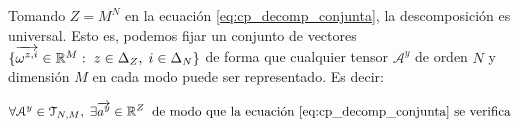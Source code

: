 \begin{proposicion}
	Tomando $Z = M^N$ en la ecuación \eqref{eq:cp_decomp_conjunta}, la descomposición es universal. Esto es, podemos fijar un conjunto de vectores $\{ \overrightarrow{\omega^{z, i}} \in \mathbb{R}^M: \; z \in \Delta_{Z}, \; i \in \Delta_{N} \}$ de forma que cualquier tensor $\mathcal{A}^y$ de orden $N$ y dimensión $M$ en cada modo puede ser representado. Es decir:

	\begin{equation}
		\forall \mathcal{A}^y \in \mathcal{T}_{N, M}, \; \exists \overrightarrow{a^y} \in \mathbb{R}^Z \;\; \text{de modo que la ecuación \eqref{eq:cp_decomp_conjunta} se verifica}
	\end{equation}
\end{proposicion}

